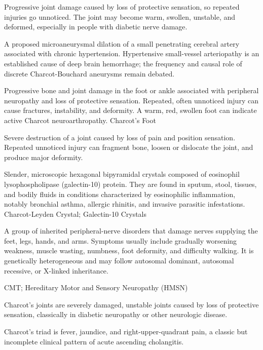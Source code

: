  Progressive joint damage caused by loss of protective sensation, so repeated injuries go unnoticed. The joint may become warm, swollen, unstable, and deformed, especially in people with diabetic nerve damage.

 A proposed microaneurysmal dilation of a
small penetrating cerebral artery associated with chronic hypertension.
Hypertensive small-vessel arteriopathy is an established cause of deep brain
hemorrhage; the frequency and causal role of discrete Charcot-Bouchard
aneurysms remain debated.

 Progressive bone and joint damage in the foot or ankle associated
with peripheral neuropathy and loss of protective sensation. Repeated, often unnoticed
injury can cause fractures, instability, and deformity. A warm, red, swollen foot can
indicate active Charcot neuroarthropathy.
\synonyms
Charcot's Foot

 Severe destruction of a joint caused by loss of pain and position sensation. Repeated unnoticed injury can fragment bone, loosen or dislocate the joint, and produce major deformity.

 Slender, microscopic hexagonal bipyramidal crystals composed of eosinophil lysophospholipase (galectin-10) protein. They are found in sputum, stool, tissues, and bodily fluids in conditions characterized by eosinophilic inflammation, notably bronchial asthma, allergic rhinitis, and invasive parasitic infestations.
\synonyms
Charcot-Leyden Crystal; Galectin-10 Crystals

 A group of inherited peripheral-nerve disorders that damage nerves supplying the feet, legs, hands, and arms. Symptoms usually include gradually worsening weakness, muscle wasting, numbness, foot deformity, and difficulty walking. It is genetically heterogeneous and may follow autosomal dominant, autosomal recessive, or X-linked inheritance.

\synonyms
CMT; Hereditary Motor and Sensory Neuropathy (HMSN)

 Charcot’s joints are severely damaged, unstable joints caused by loss of protective sensation, classically in diabetic neuropathy or other neurologic disease.

 Charcot’s triad is fever, jaundice, and right-upper-quadrant pain, a classic but incomplete clinical pattern of acute ascending cholangitis.

